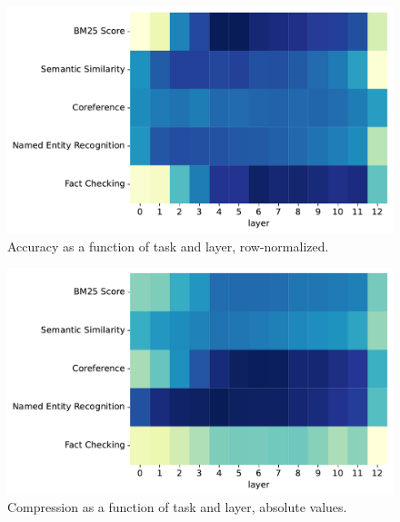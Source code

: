 \begin{figure}
    \centering
    \includegraphics[width=\textwidth]{gfx/probing/heatmap_accuracy}
    \caption{Accuracy as a function of task and layer, row-normalized.}
\end{figure}

\begin{figure}
    \centering
    \includegraphics[width=\textwidth]{gfx/probing/abs_heatmap_compression}
    \caption{Compression as a function of task and layer, absolute values.}
\end{figure}
